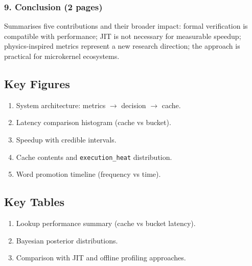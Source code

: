 \subsubsection{9. Conclusion (2 pages)}

Summarises five contributions and their broader impact: formal verification
is compatible with performance; JIT is not necessary for measurable speedup;
physics-inspired metrics represent a new research direction; the approach is
practical for microkernel ecosystems.

\subsection{Key Figures}

\begin{enumerate}
  \item System architecture: metrics $\to$ decision $\to$ cache.
  \item Latency comparison histogram (cache vs bucket).
  \item Speedup with credible intervals.
  \item Cache contents and \texttt{execution\_heat} distribution.
  \item Word promotion timeline (frequency vs time).
\end{enumerate}

\subsection{Key Tables}

\begin{enumerate}
  \item Lookup performance summary (cache vs bucket latency).
  \item Bayesian posterior distributions.
  \item Comparison with JIT and offline profiling approaches.
\end{enumerate}
